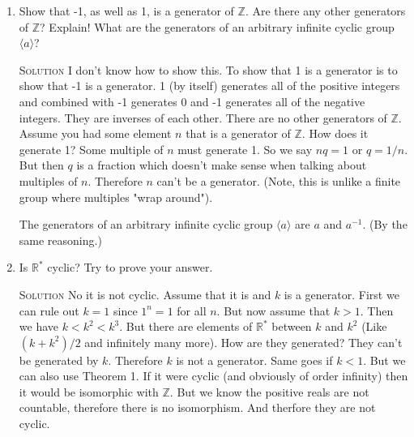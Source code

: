 \documentclass[twoside]{amsart}
\newcommand{\Reals}{\ensuremath{\mathbb{R}}\xspace}
\newcommand{\Integers}{\ensuremath{\mathbb{Z}{}}\xspace}
\newcommand{\solution}{\textsc{Solution}\xspace}
\newcommand{\blank}{\vspace{5pt}}
\newcommand{\ind}{\hspace{.35in}}
\newcommand{\itm}{\blank\item}
\newcommand{\sol}{\blank\noindent\solution}
\begin{document}
\begin{enumerate}[A.]
\begin{enumerate}[1)]
      \itm Show that -1, as well as 1, is a generator of $\Integers$. Are there
      any other generators of $\Integers$? Explain! What are the generators
      of an arbitrary infinite cyclic group $\langle a \rangle$?

      \sol I don't know how to show this. To show that 1 is a generator is
      to show that -1 is a generator. 1 (by itself) generates all of the
      positive integers and combined with -1 generates 0 and -1 generates
      all of the negative integers. They are inverses of each other.
      There are no other generators of $\Integers$. Assume you had some
      element $n$ that is a generator of $\Integers$. How does it
      generate 1? Some multiple of $n$ must generate 1. So we say
      $nq = 1$ or $q = 1/n$. But then $q$ is a fraction which doesn't make
      sense when talking about multiples of $n$. Therefore $n$ can't
      be a generator. (Note, this is unlike a finite group where 
      multiples "wrap around").
      
      \ind The generators of an arbitrary infinite cyclic group $\langle a
      \rangle$ are $a$ and $a^{-1}$. (By the same reasoning.)

      \itm Is $\Reals^*$ cyclic? Try to prove your answer.

      \sol No it is not cyclic. Assume that it is and $k$ is a generator. First
      we can rule out $k=1$ since $1^n = 1$ for all $n$. But now assume that $k
      > 1$.  Then we have $k < k^2 < k^3$. But there are elements of $\Reals^*$
      between $k$ and $k^2$ (Like $(k + k^2)/2$ and infinitely many more).  How
      are they generated?  They can't be generated by $k$. Therefore $k$
      is not a generator. Same goes if $k< 1$. But we can also use Theorem 1.
      If it were cyclic (and obviously of order infinity) then it would
      be isomorphic with $\Integers$. But we know the positive reals are not
      countable, therefore there is no isomorphism. And therfore they 
      are not cyclic.
   \end{enumerate}

\end{enumerate}
\end{document}
